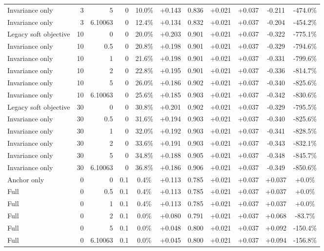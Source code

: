 \begin{table}[htbp]
\begin{tabular}{lrrrccccccc}
Invariance only & 3 & 5 & 0 & 10.0\% & +0.143 & 0.836 & +0.021 & +0.037 & -0.211 & -474.0\% \\
Invariance only & 3 & 6.10063 & 0 & 12.4\% & +0.134 & 0.832 & +0.021 & +0.037 & -0.204 & -454.2\% \\
Legacy soft objective & 10 & 0 & 0 & 20.0\% & +0.203 & 0.901 & +0.021 & +0.037 & -0.322 & -775.1\% \\
Invariance only & 10 & 0.5 & 0 & 20.8\% & +0.198 & 0.901 & +0.021 & +0.037 & -0.329 & -794.6\% \\
Invariance only & 10 & 1 & 0 & 21.6\% & +0.198 & 0.901 & +0.021 & +0.037 & -0.331 & -799.6\% \\
Invariance only & 10 & 2 & 0 & 22.8\% & +0.195 & 0.901 & +0.021 & +0.037 & -0.336 & -814.7\% \\
Invariance only & 10 & 5 & 0 & 26.0\% & +0.186 & 0.902 & +0.021 & +0.037 & -0.340 & -825.6\% \\
Invariance only & 10 & 6.10063 & 0 & 25.6\% & +0.185 & 0.903 & +0.021 & +0.037 & -0.342 & -830.6\% \\
Legacy soft objective & 30 & 0 & 0 & 30.8\% & +0.201 & 0.902 & +0.021 & +0.037 & -0.329 & -795.5\% \\
Invariance only & 30 & 0.5 & 0 & 31.6\% & +0.194 & 0.903 & +0.021 & +0.037 & -0.340 & -825.6\% \\
Invariance only & 30 & 1 & 0 & 32.0\% & +0.192 & 0.903 & +0.021 & +0.037 & -0.341 & -828.5\% \\
Invariance only & 30 & 2 & 0 & 33.6\% & +0.191 & 0.903 & +0.021 & +0.037 & -0.343 & -832.1\% \\
Invariance only & 30 & 5 & 0 & 34.8\% & +0.188 & 0.905 & +0.021 & +0.037 & -0.348 & -845.7\% \\
Invariance only & 30 & 6.10063 & 0 & 36.8\% & +0.186 & 0.906 & +0.021 & +0.037 & -0.349 & -850.6\% \\
Anchor only & 0 & 0 & 0.1 & 0.4\% & +0.113 & 0.785 & +0.021 & +0.037 & +0.037 & +0.0\% \\
Full & 0 & 0.5 & 0.1 & 0.4\% & +0.113 & 0.785 & +0.021 & +0.037 & +0.037 & +0.0\% \\
Full & 0 & 1 & 0.1 & 0.4\% & +0.113 & 0.785 & +0.021 & +0.037 & +0.037 & +0.0\% \\
Full & 0 & 2 & 0.1 & 0.0\% & +0.080 & 0.791 & +0.021 & +0.037 & +0.068 & -83.7\% \\
Full & 0 & 5 & 0.1 & 0.0\% & +0.048 & 0.800 & +0.021 & +0.037 & +0.092 & -150.4\% \\
Full & 0 & 6.10063 & 0.1 & 0.0\% & +0.045 & 0.800 & +0.021 & +0.037 & +0.094 & -156.8\% \\

\end{tabular}
\end{table}
